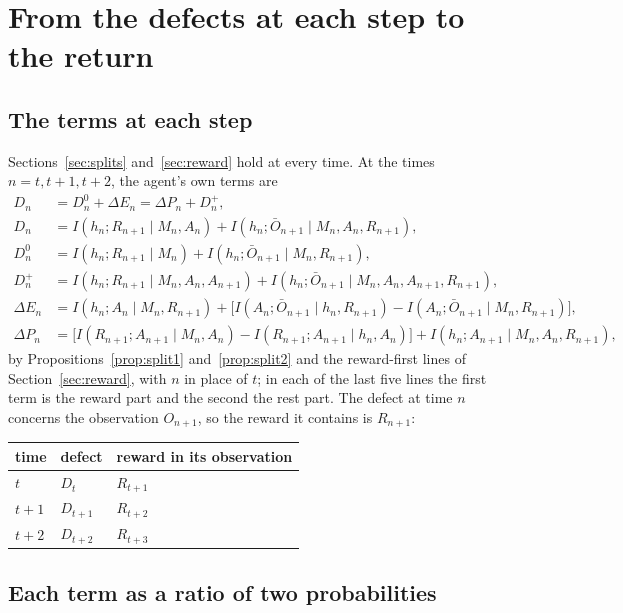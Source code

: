 \documentclass{article}
\theoremstyle{definition}
\theoremstyle{remark}
\newcommand{\dE}{\Delta E}
\newcommand{\dP}{\Delta P}
\newcommand{\Ob}{\bar O}
\begin{document}
\section{From the defects at each step to the return}\label{sec:return}

\subsection{The terms at each step}

Sections~\ref{sec:splits} and~\ref{sec:reward} hold at every time. At the times $n=t,t+1,t+2$, the agent's own terms are
\begin{align*}
D_n&=D^0_n+\dE_n=\dP_n+D^+_n,\\
D_n&=I(h_n;R_{n+1}\mid M_n,A_n)+I(h_n;\Ob_{n+1}\mid M_n,A_n,R_{n+1}),\\
D^0_n&=I(h_n;R_{n+1}\mid M_n)+I(h_n;\Ob_{n+1}\mid M_n,R_{n+1}),\\
D^+_n&=I(h_n;R_{n+1}\mid M_n,A_n,A_{n+1})+I(h_n;\Ob_{n+1}\mid M_n,A_n,A_{n+1},R_{n+1}),\\
\dE_n&=I(h_n;A_n\mid M_n,R_{n+1})+\big[I(A_n;\Ob_{n+1}\mid h_n,R_{n+1})-I(A_n;\Ob_{n+1}\mid M_n,R_{n+1})\big],\\
\dP_n&=\big[I(R_{n+1};A_{n+1}\mid M_n,A_n)-I(R_{n+1};A_{n+1}\mid h_n,A_n)\big]+I(h_n;A_{n+1}\mid M_n,A_n,R_{n+1}),
\end{align*}
by Propositions~\ref{prop:split1} and~\ref{prop:split2} and the reward-first lines of Section~\ref{sec:reward}, with $n$ in place of $t$; in each of the last five lines the first term is the reward part and the second the rest part. The defect at time $n$ concerns the observation $O_{n+1}$, so the reward it contains is $R_{n+1}$:
\begin{center}
\small
\begin{tabular}{lll}
\toprule
time & defect & reward in its observation\\
\midrule
$t$ & $D_t$ & $R_{t+1}$\\
$t+1$ & $D_{t+1}$ & $R_{t+2}$\\
$t+2$ & $D_{t+2}$ & $R_{t+3}$\\
\bottomrule
\end{tabular}
\end{center}

\subsection{Each term as a ratio of two probabilities}
\end{document}

